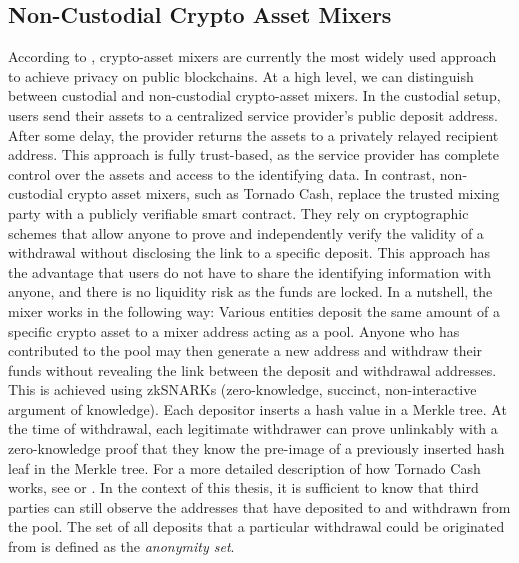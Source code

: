 \documentclass[12pt,a4paper,titlepage,oneside,english]{article}
\begin{document}
\subsection{Non-Custodial Crypto Asset Mixers}
According to \cite{nadler2023tornado}, crypto-asset mixers are currently the most widely used approach to achieve privacy on public blockchains. At a high level, we can distinguish between custodial and non-custodial crypto-asset mixers. \newline
In the custodial setup, users send their assets to a centralized service provider's public deposit address. After some delay, the provider returns the assets to a privately relayed recipient address. This approach is fully trust-based, as the service provider has complete control over the assets and access to the identifying data. \citep{nadler2023tornado} \newline 
In contrast, non-custodial crypto asset mixers, such as Tornado Cash, replace the trusted mixing party with a publicly verifiable smart contract. They rely on cryptographic schemes that allow anyone to prove and independently verify the validity of a withdrawal without disclosing the link to a specific deposit. This approach has the advantage that users do not have to share the identifying information with anyone, and there is no liquidity risk as the funds are locked. \citep{nadler2023tornado} \newline
In a nutshell, the mixer works in the following way: Various entities deposit the same amount of a specific crypto asset to a mixer address acting as a pool. Anyone who has contributed to the pool may then generate a new address and withdraw their funds without revealing the link between the deposit and withdrawal addresses. This is achieved using zkSNARKs (zero-knowledge, succinct, non-interactive argument of knowledge). 
Each depositor inserts a hash value in a Merkle tree. At the time of withdrawal, each legitimate withdrawer can prove unlinkably with a zero-knowledge proof that they know the pre-image of a previously inserted hash leaf in the Merkle tree. %
For a more detailed description of how Tornado Cash works, see \cite{nadler2023tornado} or \cite{Beres2020}. \newline
In the context of this thesis, it is sufficient to know that third parties can still observe the addresses that have deposited to and withdrawn from the pool. The set of all deposits that a particular withdrawal could be originated from is defined as the \textit{anonymity set}. 
\end{document}
